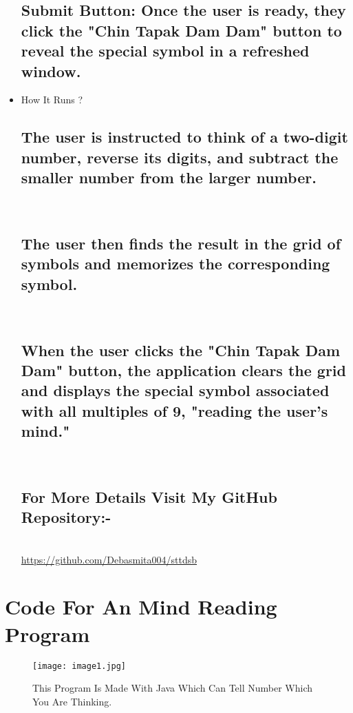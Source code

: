 \documentclass{article}
\begin{document}
\begin{itemize}
    \subsection*{Submit Button: Once the user is ready, they click the "Chin Tapak Dam Dam" button to reveal the special symbol in a refreshed window.}

\item How It Runs ?

\subsection*{The user is instructed to think of a two-digit number, reverse its digits, and subtract the smaller number from the larger number.}\\

\subsection*{The user then finds the result in the grid of symbols and memorizes the corresponding symbol.}\\

\subsection*{When the user clicks the "Chin Tapak Dam Dam" button, the application clears the grid and displays the special symbol associated with all multiples of 9, "reading the user's mind."}\\ 

\subsection*{For More Details Visit My GitHub Repository:-}\\
\url{https://github.com/Debasmita004/sttdsb}
\end{itemize}

\newpage

\section*{Code For An Mind Reading Program}
\begin{figure}[h!]
    \centering
\texttt{[image: image1.jpg]}
    \caption{This Program Is Made With Java Which Can Tell Number Which You Are Thinking.}
    \label{fig:image1}
\end{figure}
\end{document}
